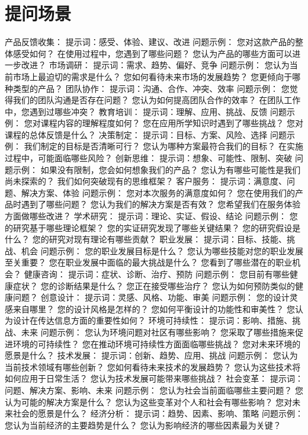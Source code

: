 \documentclass[12pt]{book}
\begin{document}
\section{提问场景}
产品反馈收集：
提示词：感受、体验、建议、改进
问题示例：
您对这款产品的整体感受如何？
在使用过程中，您遇到了哪些问题？
您认为产品的哪些方面可以进一步改进？
市场调研：
提示词：需求、趋势、偏好、竞争
问题示例：
您认为当前市场上最迫切的需求是什么？
您如何看待未来市场的发展趋势？
您更倾向于哪种类型的产品？
团队协作：
提示词：沟通、合作、冲突、效率
问题示例：
您觉得我们的团队沟通是否存在问题？
您认为如何提高团队合作的效率？
在团队工作中，您遇到过哪些冲突？
教育培训：
提示词：理解、应用、挑战、反馈
问题示例：
您对课程内容的理解程度如何？
您在应用所学知识时遇到了哪些挑战？
您对课程的总体反馈是什么？
决策制定：
提示词：目标、方案、风险、选择
问题示例：
我们制定的目标是否清晰可行？
您认为哪种方案最符合我们的目标？
在实施过程中，可能面临哪些风险？
创新思维：
提示词：想象、可能性、限制、突破
问题示例：
如果没有限制，您会如何想象我们的产品？
您认为有哪些可能性是我们尚未探索的？
我们如何突破现有的思维框架？
客户服务：
提示词：满意度、问题、解决方案、体验
问题示例：
您对本次服务的满意度如何？
您在使用我们的产品时遇到了哪些问题？
您认为我们的解决方案是否有效？
您希望我们在服务体验方面做哪些改进？
学术研究：
提示词：理论、实证、假设、结论
问题示例：
您的研究基于哪些理论框架？
您的实证研究发现了哪些关键结果？
您的研究假设是什么？
您的研究对现有理论有哪些贡献？
职业发展：
提示词：目标、技能、挑战、机会
问题示例：
您的职业发展目标是什么？
您认为哪些技能对您的职业发展至关重要？
您在职业发展中面临的最大挑战是什么？
您看到了哪些潜在的职业机会？
健康咨询：
提示词：症状、诊断、治疗、预防
问题示例：
您目前有哪些健康症状？
您的诊断结果是什么？
您正在接受哪些治疗？
您认为如何预防类似的健康问题？
创意设计：
提示词：灵感、风格、功能、审美
问题示例：
您的设计灵感来自哪里？
您的设计风格是怎样的？
您如何平衡设计的功能性和审美性？
您认为设计在传达信息方面的重要性如何？
环境可持续性：
提示词：影响、措施、挑战、未来
问题示例：
您认为环境问题对社区有哪些影响？
您采取了哪些措施来促进环境的可持续性？
您在推动环境可持续性方面面临哪些挑战？
您对未来环境的愿景是什么？
技术发展：
提示词：创新、趋势、应用、挑战
问题示例：
您认为当前技术领域有哪些创新？
您如何看待未来技术的发展趋势？
您认为这些技术将如何应用于日常生活？
您认为技术发展可能带来哪些挑战？
社会变革：
提示词：问题、解决方案、影响、未来
问题示例：
您认为社会当前面临哪些主要问题？
您认为可能的解决方案是什么？
您认为这些变革对个人和社会有哪些影响？
您对未来社会的愿景是什么？
经济分析：
提示词：趋势、因素、影响、策略
问题示例：
您认为当前经济的主要趋势是什么？
您认为影响经济的哪些因素最为关键？
\end{document}
